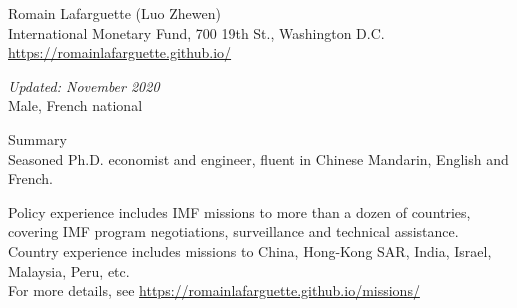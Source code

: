 \documentclass[usegeometry, 10pt, a4paper]{cv} %
\begin{document}
\hspace{15mm}
\begin{chapeau}
\begin{adresse}
\begin{flushleft}
    Romain Lafarguette (Luo Zhewen)\\
    International Monetary Fund, 700 19th St., Washington D.C.\\
    \url{https://romainlafarguette.github.io/} \\
\end{flushleft}
\end{adresse}
\begin{etatcivil}
\begin{flushleft}
  \emph{Updated: November 2020}\\
Male, French national
\end{flushleft}
\end{etatcivil}
\end{chapeau}


\begin{rubriquetableau}[0.95\textwidth]{Summary}\\
  \vspace{-0.3cm}
  \noindent Seasoned Ph.D. economist and engineer, fluent in Chinese Mandarin,
  English and French.\\

  \smallskip

\noindent Policy  experience includes  IMF missions  to more  than a  dozen of
countries,  covering  IMF  program negotiations,  surveillance  and  technical
assistance.  Country experience  includes  missions to  China, Hong-Kong  SAR,
India, Israel, Malaysia, Peru, etc.\\
For more details, see \url{https://romainlafarguette.github.io/missions/} \\

\end{rubriquetableau}

\vspace{0.5cm}
\end{document}
